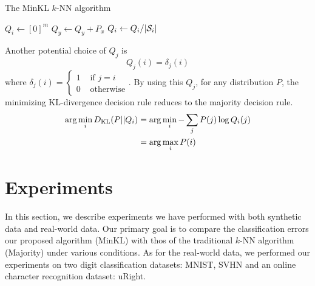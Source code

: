\documentclass{article}
\begin{document}
\begin{algorithm}
\caption{The MinKL $k$-NN algorithm}
\label{alg:minkl}
\begin{algorithmic}[1]
\STATE $Q_i \leftarrow [0]^m$
\ENDFOR
{}
\STATE $Q_y \leftarrow Q_y + P_x$
\ENDFOR
{}
\STATE $Q_i \leftarrow Q_i / |\mathcal{S}_i|$
\ENDFOR
\end{algorithmic}
\end{algorithm}

Another potential choice of $Q_j$ is 
\[
Q_j(i) = \delta_j(i)
\]
where $\delta_j(i) = \begin{cases} 1 &\mbox{ if } j = i\\ 0 &\mbox{ otherwise} \end{cases}$.
By using this $Q_j$, for any distribution $P$, the minimizing
KL-divergence decision rule reduces to the majority decision rule.
\begin{align*}
\arg\min_i D_{\mathrm{KL}}(P||Q_i) &= \arg\min_i -\sum_{j} P(j) \log Q_i(j)\\
 &= \arg\max_i P(i)\\
\end{align*}

\section{Experiments}

In this section, we describe experiments we have performed with both
synthetic data and real-world data. Our primary goal is to compare the
classification errors our proposed algorithm (MinKL) with thos of the
traditional $k$-NN algorithm (Majority) under various conditions. 
As for the real-world data, we performed our experiments on two
digit classification datasets: MNIST, SVHN and an online character
recognition dataset: uRight.
\end{document}
